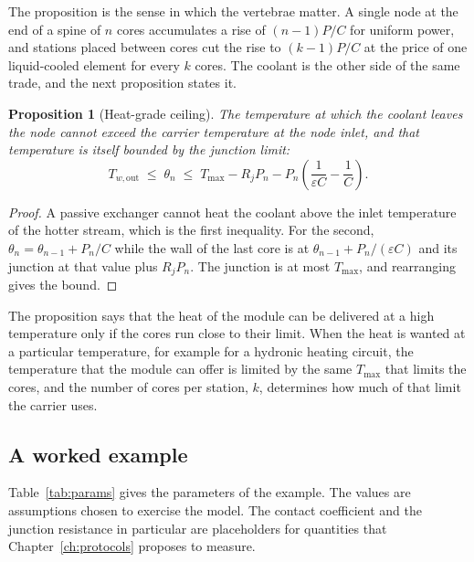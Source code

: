 \documentclass[11pt,openany]{book}
\theoremstyle{plain}
\newtheorem{proposition}[theorem]{Proposition}
\theoremstyle{definition}
\theoremstyle{remark}
\begin{document}
The proposition is the sense in which the vertebrae matter. A single node at the end of a spine of $n$ cores accumulates a rise of $(n-1)P/C$ for uniform power, and stations placed between cores cut the rise to $(k-1)P/C$ at the price of one liquid-cooled element for every $k$ cores. The coolant is the other side of the same trade, and the next proposition states it.

\begin{proposition}[Heat-grade ceiling]\label{prop:grade}
The temperature at which the coolant leaves the node cannot exceed the carrier temperature at the node inlet, and that temperature is itself bounded by the junction limit:
\[
T_{w,\mathrm{out}}\;\le\;\theta_n\;\le\;T_{\max}-R_jP_n-P_n\!\left(\frac{1}{\varepsilon C}-\frac1C\right).
\]
\end{proposition}
\begin{proof}
A passive exchanger cannot heat the coolant above the inlet temperature of the hotter stream, which is the first inequality. For the second, $\theta_n=\theta_{n-1}+P_n/C$ while the wall of the last core is at $\theta_{n-1}+P_n/(\varepsilon C)$ and its junction at that value plus $R_jP_n$. The junction is at most $T_{\max}$, and rearranging gives the bound.
\end{proof}

The proposition says that the heat of the module can be delivered at a high temperature only if the cores run close to their limit. When the heat is wanted at a particular temperature, for example for a hydronic heating circuit, the temperature that the module can offer is limited by the same $T_{\max}$ that limits the cores, and the number of cores per station, $k$, determines how much of that limit the carrier uses.

\subsection{A worked example}
\label{sec:example}

Table~\ref{tab:params} gives the parameters of the example. The values are assumptions chosen to exercise the model. The contact coefficient and the junction resistance in particular are placeholders for quantities that Chapter~\ref{ch:protocols} proposes to measure.
\end{document}
